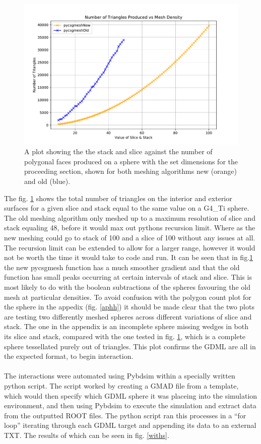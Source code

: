 \documentclass[12pt,a4paper]{article}
\begin{document}
\begin{figure}[h!]
\centering
\includegraphics[height=.4\linewidth]{Images//Triangles//MeshvTRi1.pdf}
\caption[width=\columnwidth]{A plot showing the the stack and slice against the number of polygonal faces produced on a sphere with the set dimensions for the proceeding section, shown for both meshing algorithms new (orange) and old (blue).}
\label{tritri}
\end{figure}
\noindent The fig. \ref{tritri} shows the total number of triangles on the interior and exterior surfaces for a given slice and stack equal to the same value on a G4\_Ti sphere. The old meshing algorithm only meshed up to a maximum resolution of slice and stack equaling 48, before it would max out pythons recursion limit. Where as the new meshing could go to stack of 100 and a slice of 100 without any issues at all. The recursion limit can be extended to allow for a larger range, however it would not be worth the time it would take to code and run. 
 It can be seen that in fig.\ref{tritri} the new pycsgmesh function has a much smoother gradient and that the old function has small peaks occurring at certain intervals of stack and slice. This is most likely to do with the boolean subtractions of the spheres favouring the old mesh at particular densities. To avoid confusion with the polygon count plot for the sphere in the appedix (fig. \ref{aphh}) it should be made clear that the two plots are testing two differently meshed spheres across different variations of slice and stack. The one in the appendix is an incomplete sphere missing wedges in both its slice and stack, compared with the one tested in fig. \ref{tritri}, which is a complete sphere tessellated purely out of triangles.  This plot confirms the GDML are all in the expected format, to begin interaction.
 \\\\
\noindent The interactions were automated using Pybdsim within a specially written python script. The script worked by creating a GMAD file from a template, which would then specify which GDML sphere it was placeing into the simulation environment, and then using Pybdsim to execute the simulation and extract data from the outputted ROOT files. The python script ran this processes in a ``for loop'' iterating through each GDML target and appending its data to an external TXT. The results of which can be seen in fig. \ref{withs}.
\end{document}

